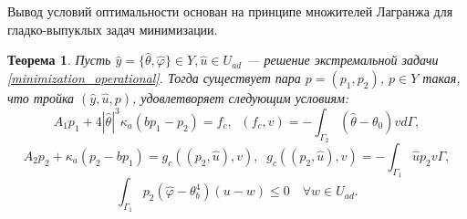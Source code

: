 \documentclass[10pt]{article}
\newtheorem{thm}{\indent Теорема}
\begin{document}
    Вывод условий оптимальности основан на принципе множителей
    Лагранжа для гладко-выпуклых задач минимизации.
    \begin{thm}
        \label{adjoint_theorem}
        Пусть $\hat{y}=\{\hat{\theta},\hat{\varphi} \} \in Y, \hat{u} \in U_{ad}$ --- решение
        экстремальной задачи \eqref{minimization_operational}.
        Тогда существует пара $p = (p_1, p_2)$, $p \in Y$
        такая, что тройка $(\hat{y}, \hat{u}, p)$, удовлетворяет следующим условиям:
        \begin{equation}
            \label{theorem_2_eq1}
            A_1 p_1 + 4 |\hat{\theta}|^3 \kappa_a(b p_1 - p_2) = f_c, \;\;
            (f_c,v) = - \int_{\Gamma_2} (\hat{\theta} - \theta_0) v d\Gamma,
        \end{equation}
        \begin{equation}
            \label{theorem_2_eq2}
            A_2 p_2 + \kappa_a (p_2-b p_1) = g_c(( p_2, \hat{u}),v), \;\;
            g_c(( p_2, \hat{u}),v) = -\int_{\Gamma_1} \hat{u} p_2 v\Gamma,
        \end{equation}
        \begin{equation}
            \label{theorem_2_eq3}
            \int_{\Gamma_1} p_2 (\hat{\varphi} - \theta_b^4)(u-w) \leq 0
            \quad \forall w \in U_{ad}.
        \end{equation}
    \end{thm}
\end{document}
